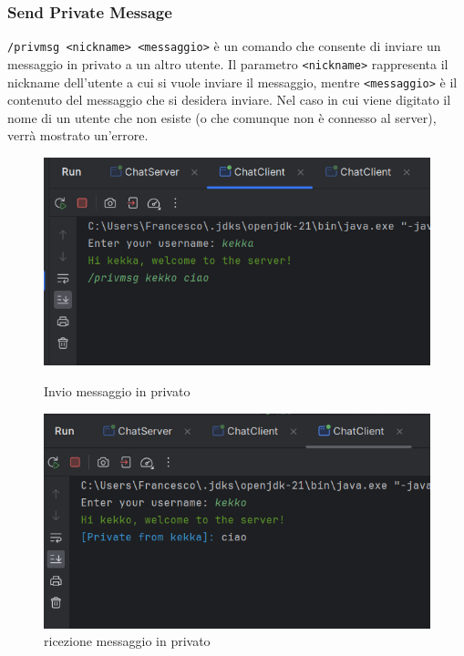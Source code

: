 \subsubsection{Send Private Message}
\texttt{/privmsg <nickname> <messaggio>} è un comando che consente di inviare un messaggio in privato a un altro utente. Il parametro \texttt{<nickname>} rappresenta il nickname dell'utente a cui si vuole inviare il messaggio, mentre \texttt{<messaggio>} è il contenuto del messaggio che si desidera inviare. Nel caso in cui viene digitato il nome di un utente che non esiste (o che comunque non è connesso al server), verrà mostrato un'errore.
\begin{figure}[h]
  \centering
  \begin{minipage}{0.45\textwidth}
    \includegraphics[width=\linewidth]{imagens/outputs/5.png}
    \caption{Invio messaggio in privato}
  \end{minipage}\hfill
  \begin{minipage}{0.45\textwidth}
    \includegraphics[width=\linewidth]{imagens/outputs/5_2.png}
    \caption{ricezione messaggio in privato}
  \end{minipage}\hfill
\end{figure}

